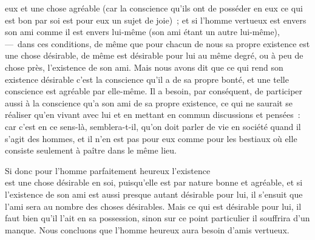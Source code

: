 \documentclass[french,twoside]{book} %
\begin{document}
eux et une chose agréable (car la conscience qu’ils ont de posséder en eux ce qui est bon par soi est pour eux un sujet de joie) ; et si l’homme vertueux est envers son ami comme il est envers lui-même (son ami étant un autre lui-même), — dans ces conditions, de même que pour chacun de nous sa propre existence est une chose désirable, de même est désirable pour lui au même degré, ou à peu de chose près, l’existence de son ami. Mais nous avons dit que ce qui rend son existence désirable c’est la conscience qu’il a de sa propre bonté, et une telle \\
conscience est agréable par elle-même. Il a besoin, par conséquent, de participer aussi à la conscience qu’a son ami de sa propre existence, ce qui ne saurait se réaliser qu’en vivant avec lui et en mettant en commun discussions et pensées : car c’est en ce sens-là, semblera-t-il, qu’on doit parler de vie en société quand il s’agit des hommes, et il n’en est pas pour eux comme pour les bestiaux où elle consiste seulement à paître dans le même lieu.\par
Si donc pour l’homme parfaitement heureux l’existence \\
est une chose désirable en soi, puisqu’elle est par nature bonne et agréable, et si l’existence de son ami est aussi presque autant désirable pour lui, il s’ensuit que l’ami sera au nombre des choses désirables. Mais ce qui est désirable pour lui, il faut bien qu’il l’ait en sa possession, sinon sur ce point particulier il souffrira d’un manque. Nous concluons que l’homme heureux aura besoin d’amis vertueux.
\end{document}
